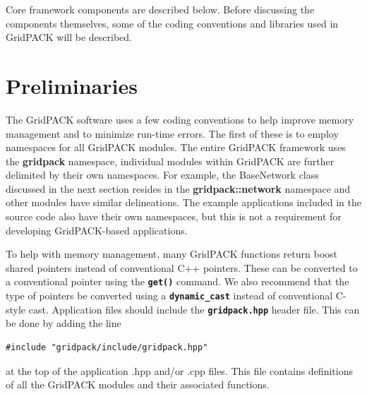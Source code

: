 


Core framework components are described below. Before discussing the components themselves, some of the coding conventions and libraries used in GridPACK will be described.

\section{Preliminaries} The GridPACK software uses a few coding conventions to help improve memory management and to minimize run-time errors. The first of these is to employ namespaces for all GridPACK modules. The entire GridPACK framework uses the \textbf{gridpack} namespace, individual modules within GridPACK are further delimited by their own namespaces. For example, the BaseNetwork class discussed in the next section resides in the \textbf{gridpack::network} namespace and other modules have similar delineations. The example applications included in the source code also have their own namespaces, but this is not a requirement for developing GridPACK-based applications.

To help with memory management, many GridPACK functions return boost shared pointers instead of conventional C++ pointers. These can be converted to a conventional pointer using the \texttt{\textbf{get()}} command. We also recommend that the type of pointers be converted using a \texttt{\textbf{dynamic\_cast}} instead of conventional C-style cast.
Application files should include the \texttt{\textbf{gridpack.hpp}} header file. This can be done by adding the line

{
\color{red}
\begin{Verbatim}[fontseries=b]
    #include "gridpack/include/gridpack.hpp"
\end{Verbatim}
}

at the top of the application .hpp and/or .cpp files. This file contains definitions of all the GridPACK modules and their associated functions.

